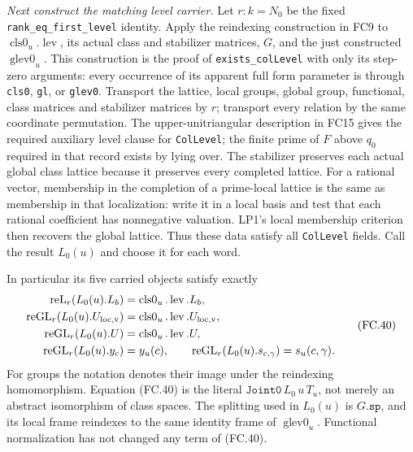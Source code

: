 \documentclass[11pt,a4paper]{article}
\numberwithin{equation}{section}
\theoremstyle{remark}\newtheorem{remark}[theorem]{Remark}
\begin{document}
\emph{Next construct the matching level carrier.}
Let $r:k=N_0$ be the fixed \texttt{rank\_\allowbreak eq\_\allowbreak first\_\allowbreak level}
identity. Apply the reindexing construction in FC9 to
$\operatorname{cls0}_u.\operatorname{lev}$, its actual class and
stabilizer matrices, $G$, and the just constructed
$\operatorname{glev0}_u$. This construction is the proof of
\texttt{exists\_\allowbreak colLevel} with only its step-zero arguments:
every occurrence of its apparent full form parameter is through
\texttt{cls0}, \texttt{gl}, or \texttt{glev0}.
Transport the lattice, local groups, global group, functional,
class matrices and stabilizer matrices by $r$; transport every
relation by the same coordinate permutation. The upper-unitriangular
description in FC15 gives the required auxiliary level clause for
\texttt{ColLevel}; the finite prime of $F$ above $q_0$ required in
that record exists by lying over. The stabilizer preserves each actual global
class lattice because it preserves every completed lattice. For a rational
vector, membership in the completion of a prime-local lattice is the same
as membership in that localization: write it in a local basis and test
that each rational coefficient has nonnegative valuation. LP1's local
membership criterion then recovers the global lattice.
Thus these data satisfy all \texttt{ColLevel} fields. Call the result
$L_0(u)$ and choose it for each word.

In particular its five carried objects satisfy exactly
\[
\begin{split}
 \operatorname{reL}_{r}(L_0(u).L_b)&=
                         \operatorname{cls0}_u.\operatorname{lev}.L_b,\\
 \operatorname{reGL}_{r}(L_0(u).U_{\rm loc,v})&=
                         \operatorname{cls0}_u.\operatorname{lev}.U_{\rm loc,v},\\
 \operatorname{reGL}_{r}(L_0(u).U)&=
                         \operatorname{cls0}_u.\operatorname{lev}.U,\\
 \operatorname{reGL}_{r}(L_0(u).y_c)&=y_u(c),\qquad
 \operatorname{reGL}_{r}(L_0(u).s_{c,\gamma})=s_u(c,\gamma).
\end{split}
 \tag{FC.40}
\]
For groups the notation denotes their image under the reindexing
homomorphism. Equation (FC.40) is the literal
$\texttt{Joint0}\,L_0\,u\,T_u$, not merely an abstract isomorphism
of class spaces. The splitting used in $L_0(u)$ is $G.\texttt{sp}$,
and its local frame reindexes to the same identity frame of
$\operatorname{glev0}_u$. Functional normalization has not changed
any term of (FC.40).
\end{document}
